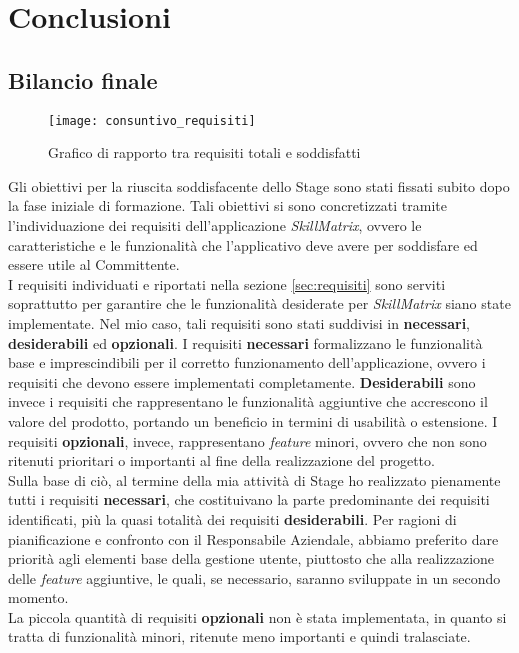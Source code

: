 
\chapter{Conclusioni}
\label{cap:conclusioni}

\section{Bilancio finale}
\begin{figure}[!ht] 
    \centering 
    \texttt{[image: consuntivo\_requisiti]} 
    \caption{Grafico di rapporto tra requisiti totali e soddisfatti}
\end{figure}
Gli obiettivi per la riuscita soddisfacente dello Stage sono stati fissati subito dopo la fase iniziale di formazione. Tali obiettivi si sono concretizzati tramite l'individuazione dei requisiti dell'applicazione \emph{SkillMatrix}, ovvero le caratteristiche e le funzionalità che l'applicativo deve avere per soddisfare ed essere utile al Committente.\\
I requisiti individuati e riportati nella sezione \ref{sec:requisiti} sono serviti soprattutto per garantire che le funzionalità desiderate per \emph{SkillMatrix} siano state implementate. Nel mio caso, tali requisiti sono stati suddivisi in \textbf{necessari}, \textbf{desiderabili} ed \textbf{opzionali}. I requisiti \textbf{necessari} formalizzano le funzionalità base e imprescindibili per il corretto funzionamento dell'applicazione, ovvero i requisiti che devono essere implementati completamente. \textbf{Desiderabili} sono invece i requisiti che rappresentano le funzionalità aggiuntive che accrescono il valore del prodotto, portando un beneficio in termini di usabilità o estensione. I requisiti \textbf{opzionali}, invece, rappresentano \emph{feature} minori, ovvero che non sono ritenuti prioritari o importanti al fine della realizzazione del progetto.\\
Sulla base di ciò, al termine della mia attività di Stage ho realizzato pienamente tutti i requisiti \textbf{necessari}, che costituivano la parte predominante dei requisiti identificati, più la quasi totalità dei requisiti \textbf{desiderabili}. Per ragioni di pianificazione e confronto con il Responsabile Aziendale, abbiamo preferito dare priorità agli elementi base della gestione utente, piuttosto che alla realizzazione delle \emph{feature} aggiuntive, le quali, se necessario, saranno sviluppate in un secondo momento.\\
La piccola quantità di requisiti \textbf{opzionali} non è stata implementata, in quanto si tratta di funzionalità minori, ritenute meno importanti e quindi tralasciate.

